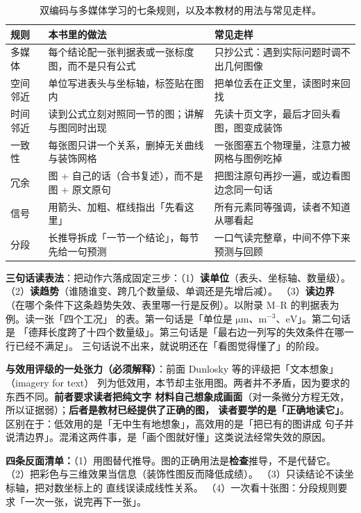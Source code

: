 \begin{table}[htbp]
  \centering
  \caption{双编码与多媒体学习的七条规则，以及本教材的用法与常见走样。}
  \label{tab:app-i-dualcode}
  \begin{tabular}{@{}p{2.2cm}p{6.2cm}p{6.2cm}@{}}
    \toprule
    规则 & 本书里的做法 & 常见走样 \\
    \midrule
    多媒体 & 每个结论配一张判据表或一张标度图，而不是只有公式 & 只抄公式：遇到实际问题时调不出几何图像 \\
    空间邻近 & 单位写进表头与坐标轴，标签贴在图内 & 把单位丢在正文里，读图时来回找 \\
    时间邻近 & 读到公式立刻对照同一节的图；讲解与图同时出现 & 先读十页文字，最后才回头看图，图变成装饰 \\
    一致性 & 每张图只讲一个关系，删掉无关曲线与装饰网格 & 一张图塞五个物理量，注意力被网格与图例吃掉 \\
    冗余 & 图 + 自己的话（合书复述），而不是图 + 原文原句 & 把图注原句再抄一遍，或边看图边念同一句话 \\
    信号 & 用箭头、加粗、框线指出「先看这里」 & 所有元素同等强调，读者不知道从哪看起 \\
    分段 & 长推导拆成「一节一个结论」，每节先给一句预测 & 一口气读完整章，中间不停下来预测与回顾 \\
    \bottomrule
  \end{tabular}
\end{table}

\textbf{三句话读表法}：把动作六落成固定三步：（1）\textbf{读单位}（表头、坐标轴、数量级）。
（2）\textbf{读趋势}（谁随谁变、跨几个数量级、单调还是先增后减）。
（3）\textbf{读边界}
（在哪个条件下这条趋势失效、表里哪一行是反例）。以附录 M--R 的判据表为例。读一张「四个工况」
的表。第一句话是「单位是 $\mathrm{\mu m}$、$\mathrm{m^{-3}}$、$\mathrm{eV}$」。第二句话是
「德拜长度跨了十四个数量级」。第三句话是「最右边一列写的失效条件在哪一行已经不满足」。
三句话说不出来，就说明还在「看图觉得懂了」的阶段。

\textbf{与效用评级的一处张力（必须解释）}：前面 Dunlosky 等的评级把「文本想象」（imagery for text）
列为低效用，本节却主张用图。两者并不矛盾，因为要求的东西不同。\textbf{前者要求读者把纯文字
材料自己想象成画面}（对一条微分方程无效，所以证据弱）；\textbf{后者是教材已经提供了正确的图，
读者要学的是「正确地读它」}。区别在于：低效用的是「无中生有地想象」，高效用的是「把已有的图讲成
句子并说清边界」。混淆这两件事，是「画个图就好懂」这类说法经常失效的原因。

\textbf{四条反面清单：}（1）用图替代推导。图的正确用法是\textbf{检查}推导，不是代替它。
（2）把彩色与三维效果当信息（装饰性图反而降低成绩）。
（3）只读结论不读坐标轴，把对数坐标上的
直线误读成线性关系。
（4）一次看十张图：分段规则要求「一次一张，说完再下一张」。


